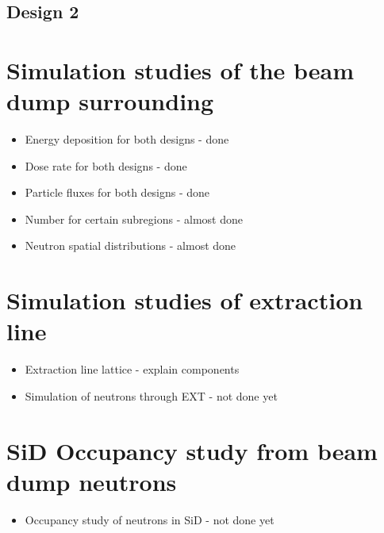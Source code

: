 \subsection{Design 2}
\label{BeamDumps:design:design2}

\section{Simulation studies of the beam dump surrounding}
\label{BeamDumps:sim_surrounding}

\begin{itemize}
 \item Energy deposition for both designs - done
 \item Dose rate for both designs - done 
 \item Particle fluxes for both designs - done 
 \item Number for certain subregions - almost done
 \item Neutron spatial distributions - almost done
\end{itemize}


\section{Simulation studies of extraction line}
\label{BeamDumps:sim_EXT}

\begin{itemize}
 \item Extraction line lattice - explain components
 \item Simulation of neutrons through EXT - not done yet
\end{itemize}

\section{SiD Occupancy study from beam dump neutrons}
\label{BeamDumps:SiDocc}

\begin{itemize}
 \item Occupancy study of neutrons in SiD - not done yet
\end{itemize}